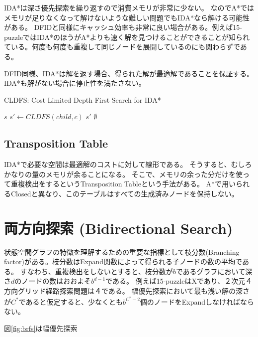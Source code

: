 \documentclass[10pt]{book}
\begin{document}
IDA*は深さ優先探索を繰り返すので消費メモリが非常に少ない。
なのでA*ではメモリが足りなくなって解けないような難しい問題でもIDA*なら解ける可能性がある。
DFIDと同様にキャッシュ効率も非常に良い場合がある。例えば15-puzzleではIDA*のほうがA*よりも速く解を見つけることができることが知られている\cite{korf:85a}。何度も何度も重複して同じノードを展開しているのにも関わらずである。

DFID同様、IDA*は解を返す場合、得られた解が最適解であることを保証する。
IDA*も解がない場合に停止性を満たさない。


\begin{algorithm}
\caption{CLDFS: Cost Limited Depth First Search for IDA*}
\label{alg:cldfs-ida}
	 {
		\Return $s$\;
	}
	 {
		 {
			$s' \leftarrow CLDFS(child, c)$
			 {
				\Return $s'$
			}
		}
	}
	\Return $\emptyset$\;
\end{algorithm}

\subsection{Transposition Table}

IDA*で必要な空間は最適解のコストに対して線形である。
そうすると、むしろかなりの量のメモリが余ることになる。
そこで、メモリの余った分だけを使って重複検出をするというTransposition Tableという手法がある。
A*で用いられるClosedと異なり、このテーブルはすべての生成済みノードを保持しない。


\section{両方向探索 (Bidirectional Search)}
\label{sec:bidirectional-search}

状態空間グラフの特徴を理解するための重要な指標として枝分数(Branching factor)がある。枝分数はExpand関数によって得られる子ノードの数の平均である。
すなわち、重複検出をしないとすると、枝分数が$b$であるグラフにおいて深さ$d$のノードの数はおおよそ$b^{d-1}$である。
例えば15-puzzleはXであり、２次元４方向グリッド経路探索問題は４である。
幅優先探索において最も浅い解の深さが$C^*$であると仮定すると、少なくとも$b^{C^*-2}$個のノードをExpandしなければならない。

図\ref{fig:brfs}は幅優先探索
\end{document}
